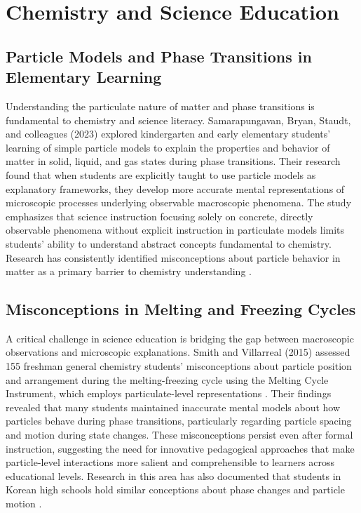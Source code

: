 \section{Chemistry and Science Education}

\subsection{Particle Models and Phase Transitions in Elementary Learning}

Understanding the particulate nature of matter and phase transitions is fundamental to chemistry and science literacy. Samarapungavan, Bryan, Staudt, and colleagues (2023) explored kindergarten and early elementary students' learning of simple particle models to explain the properties and behavior of matter in solid, liquid, and gas states during phase transitions. Their research found that when students are explicitly taught to use particle models as explanatory frameworks, they develop more accurate mental representations of microscopic processes underlying observable macroscopic phenomena. The study emphasizes that science instruction focusing solely on concrete, directly observable phenomena without explicit instruction in particulate models limits students' ability to understand abstract concepts fundamental to chemistry. Research has consistently identified misconceptions about particle behavior in matter as a primary barrier to chemistry understanding \cite{Adadan2013}.

\subsection{Misconceptions in Melting and Freezing Cycles}

A critical challenge in science education is bridging the gap between macroscopic observations and microscopic explanations. Smith and Villarreal (2015) assessed 155 freshman general chemistry students' misconceptions about particle position and arrangement during the melting-freezing cycle using the Melting Cycle Instrument, which employs particulate-level representations \cite{Smith2015}. Their findings revealed that many students maintained inaccurate mental models about how particles behave during phase transitions, particularly regarding particle spacing and motion during state changes. These misconceptions persist even after formal instruction, suggesting the need for innovative pedagogical approaches that make particle-level interactions more salient and comprehensible to learners across educational levels. Research in this area has also documented that students in Korean high schools hold similar conceptions about phase changes and particle motion \cite{Paik2004}.

